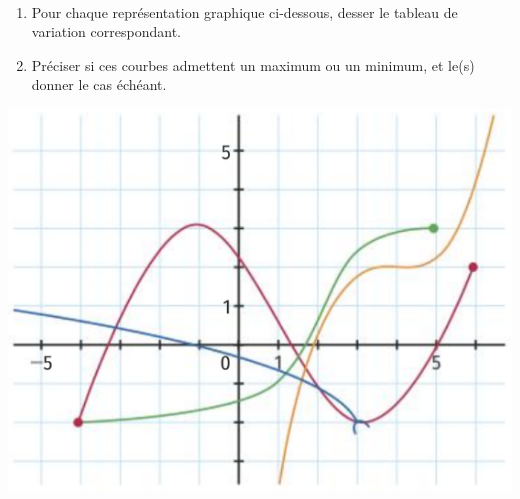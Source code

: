 \documentclass[11pt]{article}
\begin{document}
\begin{exo}~\\[-7mm]
\begin{minipage}{.5\textwidth}
  \begin{enumerate}
    \item Pour chaque représentation graphique ci-dessous, desser le tableau de
  variation correspondant.
    \item Préciser si ces courbes admettent un maximum ou un minimum, et le(s)
  donner le cas échéant.
  \end{enumerate}
\end{minipage}
\begin{minipage}{.5\textwidth}
  \begin{center}
    \includegraphics[scale=.3]{4courbes2.png}
  \end{center}
\end{minipage}
\end{exo}
\end{document}
